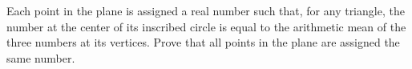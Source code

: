 Each point in the plane is assigned a real number such that, for any triangle, the number at the center of its inscribed circle is equal to the arithmetic mean of the three numbers at its vertices. Prove that all points in the plane are assigned the same number.